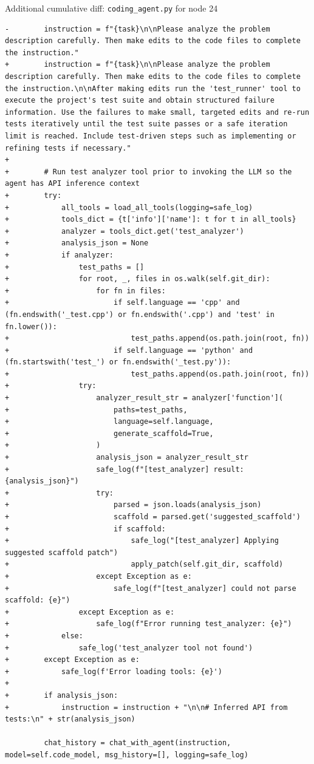 \documentclass{article}
\begin{document}
\begin{codebox}{Additional cumulative diff: \texttt{coding\_agent.py} for node 24}
\begin{lstlisting}[style=diffstyle]
-        instruction = f"{task}\n\nPlease analyze the problem description carefully. Then make edits to the code files to complete the instruction."
+        instruction = f"{task}\n\nPlease analyze the problem description carefully. Then make edits to the code files to complete the instruction.\n\nAfter making edits run the 'test_runner' tool to execute the project's test suite and obtain structured failure information. Use the failures to make small, targeted edits and re-run tests iteratively until the test suite passes or a safe iteration limit is reached. Include test-driven steps such as implementing or refining tests if necessary."
+
+        # Run test analyzer tool prior to invoking the LLM so the agent has API inference context
+        try:
+            all_tools = load_all_tools(logging=safe_log)
+            tools_dict = {t['info']['name']: t for t in all_tools}
+            analyzer = tools_dict.get('test_analyzer')
+            analysis_json = None
+            if analyzer:
+                test_paths = []
+                for root, _, files in os.walk(self.git_dir):
+                    for fn in files:
+                        if self.language == 'cpp' and (fn.endswith('_test.cpp') or fn.endswith('.cpp') and 'test' in fn.lower()):
+                            test_paths.append(os.path.join(root, fn))
+                        if self.language == 'python' and (fn.startswith('test_') or fn.endswith('_test.py')):
+                            test_paths.append(os.path.join(root, fn))
+                try:
+                    analyzer_result_str = analyzer['function'](
+                        paths=test_paths,
+                        language=self.language,
+                        generate_scaffold=True,
+                    )
+                    analysis_json = analyzer_result_str
+                    safe_log(f"[test_analyzer] result: {analysis_json}")
+                    try:
+                        parsed = json.loads(analysis_json)
+                        scaffold = parsed.get('suggested_scaffold')
+                        if scaffold:
+                            safe_log("[test_analyzer] Applying suggested scaffold patch")
+                            apply_patch(self.git_dir, scaffold)
+                    except Exception as e:
+                        safe_log(f"[test_analyzer] could not parse scaffold: {e}")
+                except Exception as e:
+                    safe_log(f"Error running test_analyzer: {e}")
+            else:
+                safe_log('test_analyzer tool not found')
+        except Exception as e:
+            safe_log(f'Error loading tools: {e}')
+
+        if analysis_json:
+            instruction = instruction + "\n\n# Inferred API from tests:\n" + str(analysis_json)

         chat_history = chat_with_agent(instruction, model=self.code_model, msg_history=[], logging=safe_log)
\end{lstlisting}
\end{codebox}
\end{document}
